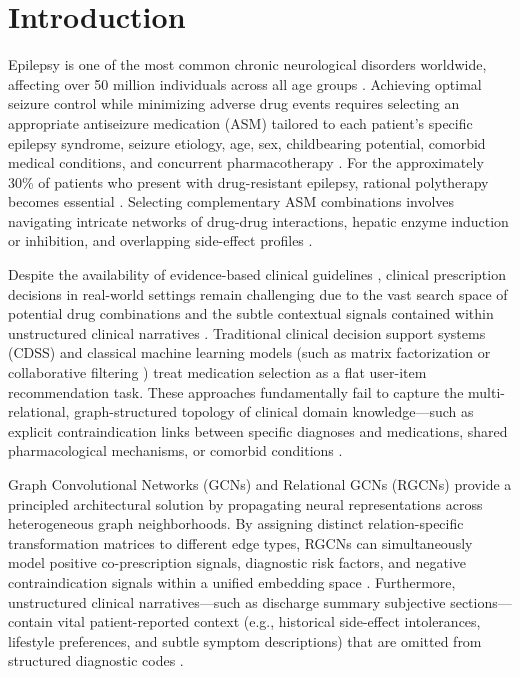 \documentclass[11pt,a4paper]{article}
\begin{document}
\clearpage

\section{Introduction}

Epilepsy is one of the most common chronic neurological disorders worldwide, affecting over 50 million individuals across all age groups \cite{who2024epilepsy}. Achieving optimal seizure control while minimizing adverse drug events requires selecting an appropriate antiseizure medication (ASM) tailored to each patient's specific epilepsy syndrome, seizure etiology, age, sex, childbearing potential, comorbid medical conditions, and concurrent pharmacotherapy \cite{glauser2013ilae, kwan2000early}. For the approximately 30\% of patients who present with drug-resistant epilepsy, rational polytherapy becomes essential \cite{perruca2021polytherapy}. Selecting complementary ASM combinations involves navigating intricate networks of drug-drug interactions, hepatic enzyme induction or inhibition, and overlapping side-effect profiles \cite{marson2021sanad}.

Despite the availability of evidence-based clinical guidelines \cite{glauser2013ilae, ilae2025classification}, clinical prescription decisions in real-world settings remain challenging due to the vast search space of potential drug combinations and the subtle contextual signals contained within unstructured clinical narratives \cite{johnson2024mimic}. Traditional clinical decision support systems (CDSS) and classical machine learning models (such as matrix factorization or collaborative filtering \cite{koren2009matrix}) treat medication selection as a flat user-item recommendation task. These approaches fundamentally fail to capture the multi-relational, graph-structured topology of clinical domain knowledge---such as explicit contraindication links between specific diagnoses and medications, shared pharmacological mechanisms, or comorbid conditions \cite{shang2019gamenet, yang2021safedrug}.

Graph Convolutional Networks (GCNs) \cite{kipf2017semi} and Relational GCNs (RGCNs) \cite{schlichtkrull2018modeling} provide a principled architectural solution by propagating neural representations across heterogeneous graph neighborhoods. By assigning distinct relation-specific transformation matrices to different edge types, RGCNs can simultaneously model positive co-prescription signals, diagnostic risk factors, and negative contraindication signals within a unified embedding space \cite{yang2021micron, yang2023molerec}. Furthermore, unstructured clinical narratives---such as discharge summary subjective sections---contain vital patient-reported context (e.g., historical side-effect intolerances, lifestyle preferences, and subtle symptom descriptions) that are omitted from structured diagnostic codes \cite{lee2020biobert, devlin2019bert}.
\end{document}
